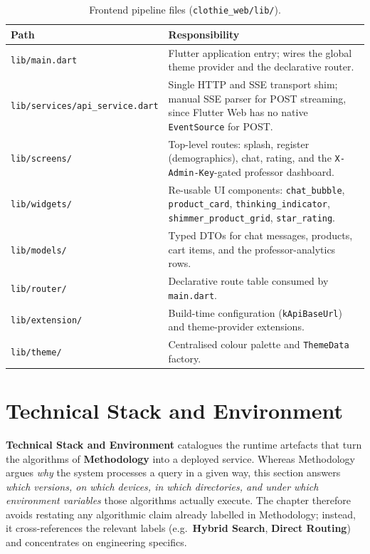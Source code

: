 \begin{table}[H]
\centering
\caption{Frontend pipeline files (\texttt{clothie\_web/lib/}).}
\label{tab:impl_frontend_files}
\small
\begin{tabular}{p{6.0cm} p{8.6cm}}
\toprule
\textbf{Path} & \textbf{Responsibility} \\
\midrule
\texttt{lib/main.dart} & Flutter application entry; wires the global theme provider and the declarative router. \\
\texttt{lib/services/api\_service.dart} & Single HTTP and SSE transport shim; manual SSE parser for POST streaming, since Flutter Web has no native \texttt{EventSource} for POST. \\
\texttt{lib/screens/} & Top-level routes: splash, register (demographics), chat, rating, and the \texttt{X-Admin-Key}-gated professor dashboard. \\
\texttt{lib/widgets/} & Re-usable UI components: \texttt{chat\_bubble}, \texttt{product\_card}, \texttt{thinking\_indicator}, \texttt{shimmer\_product\_grid}, \texttt{star\_rating}. \\
\texttt{lib/models/} & Typed DTOs for chat messages, products, cart items, and the professor-analytics rows. \\
\texttt{lib/router/} & Declarative route table consumed by \texttt{main.dart}. \\
\texttt{lib/extension/} & Build-time configuration (\texttt{kApiBaseUrl}) and theme-provider extensions. \\
\texttt{lib/theme/} & Centralised colour palette and \texttt{ThemeData} factory. \\
\bottomrule
\end{tabular}
\end{table}


\section{Technical Stack and Environment}
\label{sec:impl_stack}

\textbf{Technical Stack and Environment} catalogues the runtime artefacts that turn the algorithms of \textbf{Methodology} into a deployed service. Whereas Methodology argues \emph{why} the system processes a query in a given way, this section answers \emph{which versions, on which devices, in which directories, and under which environment variables} those algorithms actually execute. The chapter therefore avoids restating any algorithmic claim already labelled in Methodology; instead, it cross-references the relevant labels (e.g.\ \textbf{Hybrid Search}, \textbf{Direct Routing}) and concentrates on engineering specifics.


